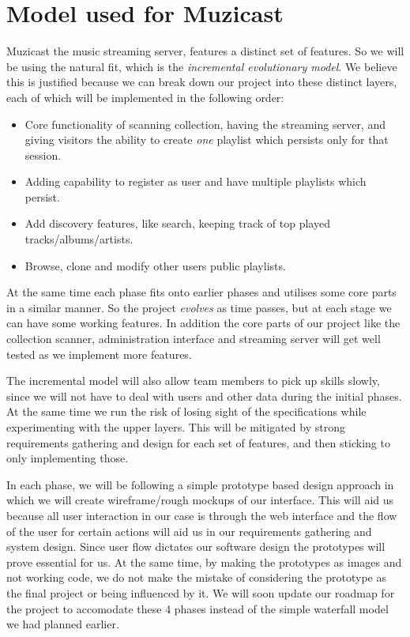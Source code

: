 \documentclass{article}
\begin{document}
\newpage{}
\section{Model used for Muzicast}

Muzicast the music streaming server, features a distinct set of features. So we will be using the natural fit, which is the \emph{incremental evolutionary model}. We believe this is justified because we can break down our project into these distinct layers, each
of which will be implemented in the following order:

\begin{itemize}
\item Core functionality of scanning collection, having the streaming server, and giving visitors the ability to create \emph{one} playlist which persists only for that session.
\item Adding capability to register as user and have multiple playlists which persist.
\item Add discovery features, like search, keeping track of top played\\ tracks/albums/artists.
\item Browse, clone and modify other users public playlists.
\end{itemize}

At the same time each phase fits onto earlier phases and utilises some core parts in a similar manner. So the project \emph{evolves} as time passes, but at each stage we can have some working features. In addition the core parts of our project like the collection scanner, administration interface and streaming server will get well tested as we implement more features.

The incremental model will also allow team members to pick up skills slowly, since we will not have to deal with users and other data during the initial phases. At the same time we run the risk of losing sight of the specifications while experimenting with the upper layers. This will be mitigated by strong requirements gathering and design for each set of features, and then sticking to only implementing those.

In each phase, we will be following a simple prototype based design approach in which we will create wireframe/rough mockups of our interface. This will aid us because all user interaction in our case is through the web interface and the flow of the user for certain actions will aid us in our requirements gathering and system design. Since user flow dictates our software design the prototypes will prove essential for us. At the same time, by making the prototypes as images and not working code, we do not make the mistake of considering the prototype as the final project or being influenced by it. We will soon update our roadmap for the project to accomodate these 4 phases instead of the simple waterfall model we had planned earlier.
\end{document}
